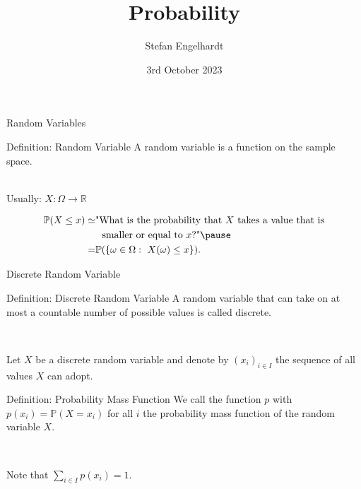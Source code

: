 \documentclass[11pt,pdf,ngerman,UKenglish]{beamer}%
\title{Probability}
\author{Stefan Engelhardt}
\date{3rd October 2023}%
\newcommand{\IR}{\mathds{R}}
\newcommand{\IP}{\mathbb{P}}
\newcommand{\1}{\mathbb{1}}
\theoremstyle{thm}
\theoremstyle{def}
\begin{document}
\begin{frame}
\titlepage
\end{frame}
\logo{}



\begin{frame}{Random Variables}

\begin{block}{Definition: Random Variable}
A random variable is a {\color{gray}{measurable}} function on the sample space.
\end{block}
\ \\
Usually: $X: \Omega \to \IR$

\pause
\begin{align*}
\IP(X \leq x) 
\simeq & \text{"What is the probability that }X\text{ takes a value that is}
\\& \ \text{ smaller or equal to }x\text{?"}
\pause
\\
= & \IP(\{ \omega \in \Omega:\ X(\omega) \leq x \} )
.
\end{align*}
\end{frame}


\begin{frame}{Discrete Random Variable}
\begin{block}{Definition: Discrete Random Variable}
A random variable that can take on at most a countable number of possible values is called discrete.
\end{block}
\
\pause

Let $X$ be a discrete random variable and denote by $(x_i)_{i\in I}$ the sequence of all values $X$ can adopt.

\begin{block}{Definition: Probability Mass Function}
We call the function $p$ with $p(x_i) = \IP( X = x_i)$ for all $i$ the probability mass function of the random variable $X$.
\end{block}
\

Note that $\sum_{i \in I} p(x_i) = 1$.
\end{frame}
\end{document}

